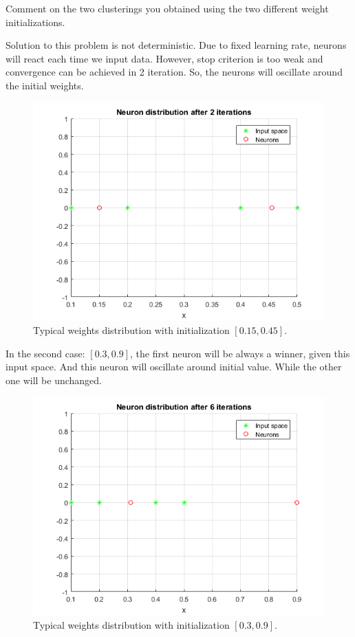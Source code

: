 \documentclass[a4paper, 12pt]{article}
\begin{document}
Comment on the two clusterings you obtained using the two different weight initializations.

\bigskip
\newpage
Solution to this problem is not deterministic. Due to fixed learning rate, neurons will react each time we input data. However, stop criterion is too weak and convergence can be achieved in 2 iteration. So, the neurons will oscillate around the initial weights.

\begin{figure}[h]
  \centering
  \caption{Typical weights distribution with initialization $[0.15, 0.45]$.}
  \includegraphics[scale = 0.7]{1}
\end{figure}

In the second case: $[0.3, 0.9]$, the first neuron will be always a winner, given this input space. And this neuron will oscillate around initial value. While the other one will be unchanged.

\begin{figure}[h]
  \centering
  \caption{Typical weights distribution with initialization $[0.3, 0.9]$.}
  \includegraphics[scale = 0.7]{4}
\end{figure}
\end{document}
